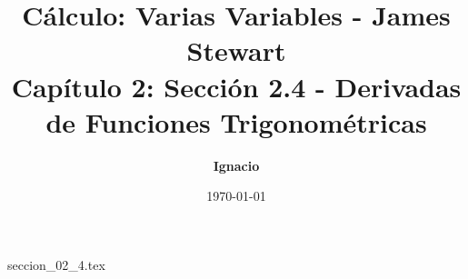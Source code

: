 \documentclass[11pt,spanish,oneside]{report}
\title{\textbf{Cálculo: Varias Variables - James Stewart} \\ \Large Capítulo 2: Sección 2.4 - Derivadas de Funciones Trigonométricas}
\author{\textbf{Ignacio}}
\date{\today}
\begin{document}
\maketitle

{seccion_02_4.tex}
\end{document}
